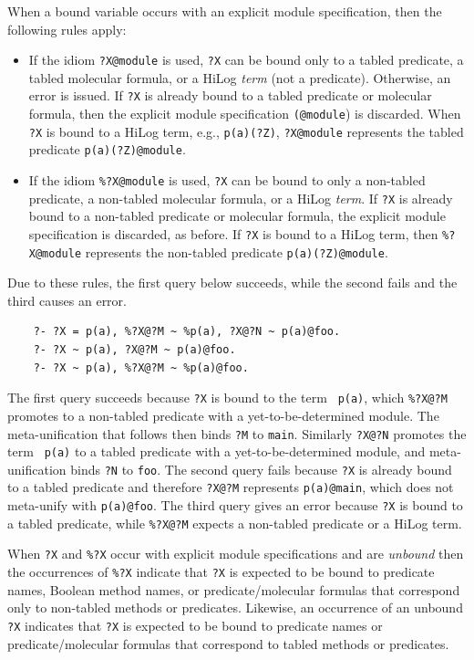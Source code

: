 \documentclass[11pt]{article}
\begin{document}
When a bound variable occurs with an explicit module specification, then
the following rules apply:
\begin{itemize}
\item If the idiom {\tt ?X@module} is used, {\tt ?X} can be bound only to a
  tabled predicate, a tabled molecular formula, or a HiLog \emph{term} (not
  a predicate).  Otherwise, an error is issued. If {\tt ?X} is already bound
  to a tabled predicate or molecular formula, then the explicit module
  specification {\tt (@module}) is discarded.  When {\tt ?X} is bound to a
  HiLog term, e.g., {\tt p(a)(?Z)}, {\tt ?X@module} represents the tabled
  predicate {\tt p(a)(?Z)@module}.
\item If the idiom {\tt \%?X@module} is used, {\tt ?X} can be bound to only a
  non-tabled predicate, a non-tabled molecular formula, or a HiLog
  \emph{term}.  If {\tt ?X} is already bound to a non-tabled predicate or
  molecular formula, the explicit module specification is discarded, as
  before.  If {\tt ?X} is bound to a HiLog term, then {\tt \%?X@module}
  represents the non-tabled predicate {\tt p(a)(?Z)@module}.
\end{itemize}
Due to these rules, the first query below succeeds, while the second
fails and the third causes an error.
\begin{verbatim}
    ?- ?X = p(a), %?X@?M ~ %p(a), ?X@?N ~ p(a)@foo.
    ?- ?X ~ p(a), ?X@?M ~ p(a)@foo.
    ?- ?X ~ p(a), %?X@?M ~ %p(a)@foo. 
\end{verbatim}
The first query succeeds because {\tt ?X} is bound to the term {\tt
p(a)}, which {\tt \%?X@?M} promotes to a non-tabled predicate with
a yet-to-be-determined module.  The meta-unification that follows then
binds {\tt ?M} to {\tt main}. Similarly {\tt ?X@?N} promotes the term {\tt
p(a)} to a tabled predicate with a yet-to-be-determined module, and
meta-unification binds {\tt ?N} to {\tt foo}. The second query fails
because {\tt ?X} is already bound to a tabled predicate and therefore
{\tt ?X@?M} represents {\tt p(a)@main}, which does not meta-unify with
{\tt p(a)@foo}.  The third query gives an error because {\tt ?X} is bound
to a tabled predicate, while {\tt \%?X@?M} expects a non-tabled predicate or a
HiLog term.

When {\tt ?X} and {\tt \%?X} occur with explicit module specifications and
are \emph{unbound} then the occurrences of {\tt \%?X} indicate that {\tt ?X}
is expected to be bound to predicate names, Boolean method names, or
predicate/molecular formulas that correspond only to non-tabled methods or
predicates. Likewise, an occurrence of an unbound {\tt ?X} indicates that
{\tt ?X} is expected to be bound to predicate names or predicate/molecular
formulas that correspond to tabled methods or predicates.
\end{document}
